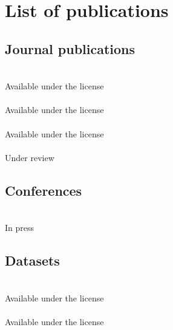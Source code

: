 \chapter{List of publications}

\section*{Journal publications}
\noindent{}%
\\
{\footnotesize Available under the \textsl{} license}\\

\noindent{}%
\\
{\footnotesize Available under the  license}\\

\noindent{}%
\\
{\footnotesize Available under the  license}\\

\noindent{}\\
{\footnotesize Under review}\\


\section*{Conferences}
\noindent{}%
\\
{\footnotesize In press}\\

\newpage
\section*{Datasets}
\noindent{}\\
{\footnotesize Available under the  license}\\

\noindent{}\\
{\footnotesize Available under the  license}